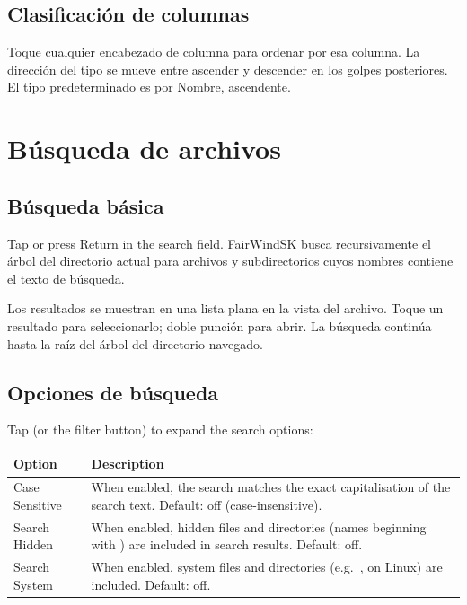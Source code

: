 \subsection{Clasificación de columnas}

Toque cualquier encabezado de columna para ordenar por esa columna.
La dirección del tipo se mueve entre ascender y descender en los golpes posteriores.
El tipo predeterminado es por Nombre, ascendente.

\section{Búsqueda de archivos}

\subsection{Búsqueda básica}

Tap  or press Return in the search field.
FairWindSK busca recursivamente el árbol del directorio actual para archivos y subdirectorios cuyos nombres
contiene el texto de búsqueda.

Los resultados se muestran en una lista plana en la vista del archivo.
Toque un resultado para seleccionarlo; doble punción para abrir.
La búsqueda continúa hasta la raíz del árbol del directorio navegado.


\subsection{Opciones de búsqueda}

Tap  (or the filter button) to expand the search options:

\begin{longtable}{L{3.5cm} L{10.2cm}}
\toprule
{}
{\sffamily\bfseries\color{white} Option} &
{\sffamily\bfseries\color{white} Description} \\
\midrule
Case Sensitive & When enabled, the search matches the exact capitalisation of the search text. Default: off (case-insensitive). \\
Search Hidden & When enabled, hidden files and directories (names beginning with ) are included in search results. Default: off. \\
Search System & When enabled, system files and directories (e.g.\ ,  on Linux) are included. Default: off. \\
\bottomrule
\end{longtable}

